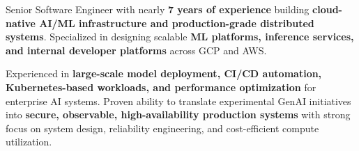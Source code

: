 \documentclass[11pt, a4paper]{awesome-cv}
\begin{document}
\makecvheader[C]

\vspace{-1.2em}

\begin{cvparagraph}
Senior Software Engineer with nearly \textbf{7 years of experience} building \textbf{cloud-native AI/ML infrastructure and production-grade distributed systems}. Specialized in designing scalable \textbf{ML platforms, inference services, and internal developer platforms} across GCP and AWS.

Experienced in \textbf{large-scale model deployment, CI/CD automation, Kubernetes-based workloads, and performance optimization} for enterprise AI systems. Proven ability to translate experimental GenAI initiatives into \textbf{secure, observable, high-availability production systems} with strong focus on system design, reliability engineering, and cost-efficient compute utilization.
\end{cvparagraph}
\vspace{-1.4em}

\end{document}
